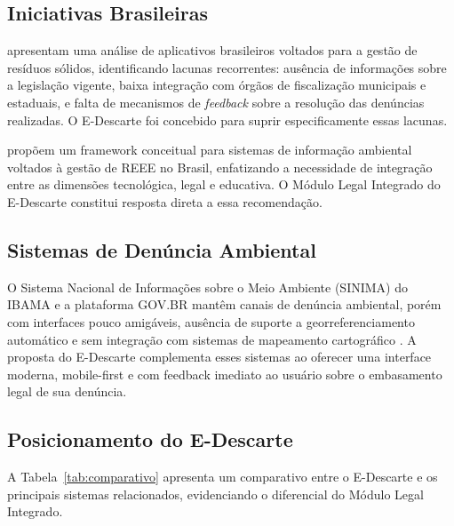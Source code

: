 \documentclass[12pt, a4paper]{article}
\numberwithin{equation}{section}
\numberwithin{figure}{section}
\numberwithin{table}{section}
\begin{document}
\subsection{Iniciativas Brasileiras}

 apresentam uma análise de aplicativos brasileiros
voltados para a gestão de resíduos sólidos, identificando lacunas recorrentes:
ausência de informações sobre a legislação vigente, baixa integração com órgãos
de fiscalização municipais e estaduais, e falta de mecanismos de \textit{feedback}
sobre a resolução das denúncias realizadas. O E-Descarte foi concebido para
suprir especificamente essas lacunas.

 propõem um framework conceitual para sistemas de
informação ambiental voltados à gestão de REEE no Brasil, enfatizando a
necessidade de integração entre as dimensões tecnológica, legal e educativa.
O Módulo Legal Integrado do E-Descarte constitui resposta direta a essa
recomendação.

\subsection{Sistemas de Denúncia Ambiental}

O Sistema Nacional de Informações sobre o Meio Ambiente (SINIMA) do IBAMA
e a plataforma GOV.BR mantêm canais de denúncia ambiental, porém com interfaces
pouco amigáveis, ausência de suporte a georreferenciamento automático e
sem integração com sistemas de mapeamento cartográfico \cite{ibama2022}.
A proposta do E-Descarte complementa esses sistemas ao oferecer uma interface
moderna, mobile-first e com feedback imediato ao usuário sobre o embasamento
legal de sua denúncia.

\subsection{Posicionamento do E-Descarte}

A Tabela~\ref{tab:comparativo} apresenta um comparativo entre o E-Descarte e
os principais sistemas relacionados, evidenciando o diferencial do Módulo Legal
Integrado.
\end{document}
